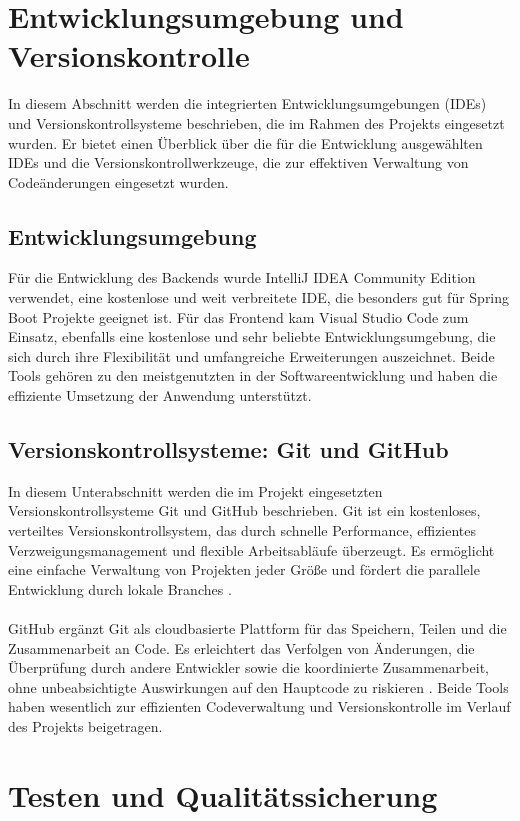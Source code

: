 \section{Entwicklungsumgebung und Versionskontrolle}
In diesem Abschnitt werden die integrierten Entwicklungsumgebungen (IDEs) und Versionskontrollsysteme beschrieben, die im Rahmen des Projekts eingesetzt wurden. Er bietet einen Überblick über die für die Entwicklung ausgewählten IDEs und die Versionskontrollwerkzeuge, die zur effektiven Verwaltung von Codeänderungen eingesetzt wurden.
\subsection{Entwicklungsumgebung}
Für die Entwicklung des Backends wurde IntelliJ IDEA Community Edition verwendet, eine kostenlose und weit verbreitete IDE, die besonders gut für Spring Boot Projekte geeignet ist. Für das Frontend kam Visual Studio Code zum Einsatz, ebenfalls eine kostenlose und sehr beliebte Entwicklungsumgebung, die sich durch ihre Flexibilität und umfangreiche Erweiterungen auszeichnet. Beide Tools gehören zu den meistgenutzten in der Softwareentwicklung und haben die effiziente Umsetzung der Anwendung unterstützt.


\subsection{Versionskontrollsysteme: Git und GitHub}

In diesem Unterabschnitt werden die im Projekt eingesetzten Versionskontrollsysteme Git und GitHub beschrieben. Git ist ein kostenloses, verteiltes Versionskontrollsystem, das durch schnelle Performance, effizientes Verzweigungsmanagement und flexible Arbeitsabläufe überzeugt. Es ermöglicht eine einfache Verwaltung von Projekten jeder Größe und fördert die parallele Entwicklung durch lokale Branches \cite{git-scmr:o.J}.\\ \\
GitHub ergänzt Git als cloudbasierte Plattform für das Speichern, Teilen und die Zusammenarbeit an Code. Es erleichtert das Verfolgen von Änderungen, die Überprüfung durch andere Entwickler sowie die koordinierte Zusammenarbeit, ohne unbeabsichtigte Auswirkungen auf den Hauptcode zu riskieren \cite{github:o.J}. Beide Tools haben wesentlich zur effizienten Codeverwaltung und Versionskontrolle im Verlauf des Projekts beigetragen.

\section{Testen und Qualitätssicherung}

